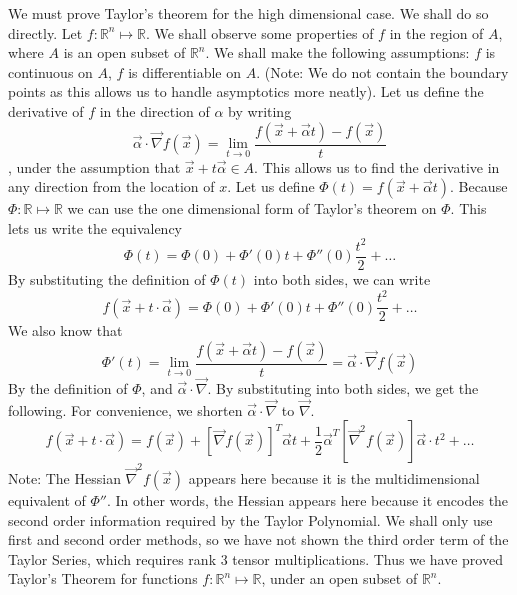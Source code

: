 \documentclass[10pt]{article}
\begin{document}
We must prove Taylor's theorem for the high dimensional case. We shall do so directly.
Let $f : \mathbb{R}^n \mapsto \mathbb{R}$. We shall observe some properties of $f$ in the region of $A$, where $A$ is an open subset of $\mathbb{R}^n$. We shall make the following assumptions: $f$ is continuous on $A$, $f$ is differentiable on $A$. (Note: We do not contain the boundary points as this allows us to handle asymptotics more neatly). 
Let us define the derivative of $f$ in the direction of $\alpha$ by writing \begin{equation}\vec{\alpha} \cdot \vec{\nabla} f(\vec{x}) = \lim_{t \to 0}\frac{f(\vec{x} + \vec{\alpha}t) - f(\vec{x})}{t}\end{equation}, under the assumption that $\vec{x} + t \vec{\alpha} \in A$. This allows us to find the derivative in any direction from the location of $x$. Let us define $\Phi(t) = f(\vec{x} + \vec{\alpha} t)$. Because $\Phi : \mathbb{R} \mapsto \mathbb{R}$
we can use the one dimensional form of Taylor's theorem \cite{wikipediacontributors-2019-taylor}on $\Phi$. This lets us write the equivalency 
\begin{equation}\Phi(t) = \Phi(0) + \Phi'(0)t + \Phi''(0)\frac{t^2}{2} + \dots\end{equation}
By substituting the definition of $\Phi(t)$ into both sides, we can write 
\begin{equation} f(\vec{x} + t \cdot \vec{\alpha}) = \Phi(0) + \Phi'(0)t + \Phi''(0)\frac{t^2}{2} + \dots\end{equation}
We also know that 
\begin{equation}\Phi'(t) = \lim_{t \to 0}\frac{f(\vec{x} + \vec{\alpha}t) - f(\vec{x})}{t} = \vec{\alpha} \cdot \vec{\nabla}f(\vec{x})\end{equation}
By the definition of $\Phi$, and $\vec{\alpha} \cdot \vec{\nabla}$.
By substituting into both sides, we get the following. For convenience, we shorten $\vec{\alpha}\cdot\vec{\nabla}$ to $\vec{\nabla}$.
\begin{equation} f(\vec{x} + t \cdot \vec{\alpha}) = f(\vec{x}) + [\vec{\nabla}f(\vec{x})]^T\vec{\alpha} t + \frac{1}{2}\vec{\alpha}^T[\vec{\nabla}^2f(\vec{x})]\vec{\alpha} \cdot t^2 + \dots\end{equation}
Note: The Hessian $\vec{\nabla}^2f(\vec{x})$ appears here because it is the multidimensional equivalent of $\Phi''$. In other words, the Hessian appears here because it encodes the second order information required by the Taylor Polynomial.
We shall only use first and second order methods, so we have not shown the third order term of the Taylor Series, which requires rank 3 tensor multiplications.
Thus we have proved Taylor's Theorem for functions $f : \mathbb{R}^n \mapsto \mathbb{R}$, under an open subset of $\mathbb{R}^n$.
\end{document}
